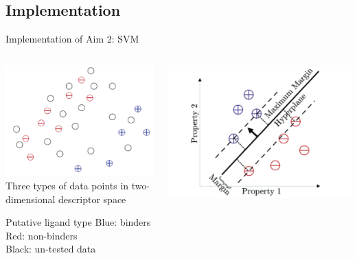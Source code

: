 \subsection{Implementation}
\begin{frame}{Implementation of Aim 2: SVM}
  \begin{columns}[T]
  \begin{column}{0.45\textwidth}
  \includegraphics[height = 0.4\textheight]{../figures/svm1.png}\\
 {\scriptsize Three types of data points in two-dimensional descriptor space \footnotemark[1]}
 \begin{block}{Putative ligand type}
 Blue: binders\\
 Red: non-binders\\
 Black: un-tested data
 \end{block}
\end{column}
\begin{column}{0.45\textwidth}
\includegraphics[height = 0.4\textheight]{../figures/svm2.png}\\

\end{column}
\end{columns}
\end{frame}
